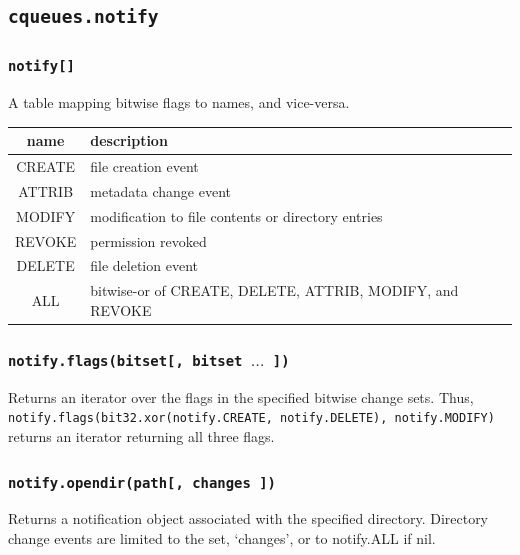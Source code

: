 \documentclass[11pt, oneside]{memoir}
\newcommand*{\fn}[1]{\texttt{#1}\xspace}
\newcounter{toccols}
\newenvironment{Module}[1]{
	\subsection{\texttt{#1}}
	\addtocontents{toc}{
		\protect\begin{multicols}{\value{toccols}}
	}
}{
	\addtocontents{toc}{\protect\end{multicols}}
}
\begin{document}
\begin{Module}{cqueues.notify}

\subsubsection[\fn{notify[]}]{\fn{notify[]}}
A table mapping bitwise flags to names, and vice-versa.

\begin{tabular}{c | l}

name & description \\\hline
CREATE & file creation event \\
ATTRIB & metadata change event \\
MODIFY & modification to file contents or directory entries \\ 
REVOKE & permission revoked \\
DELETE & file deletion event \\
ALL    & bitwise-or of CREATE, DELETE, ATTRIB, MODIFY, and REVOKE
\end{tabular}

\subsubsection[\fn{notify.flags}]{\fn{notify.flags(bitset[, bitset $\ldots$ ])}}

Returns an iterator over the flags in the specified bitwise change sets. Thus, \texttt{notify.flags(bit32.xor(notify.CREATE, notify.DELETE), notify.MODIFY)} returns an iterator returning all three flags.

\subsubsection[\fn{notify.opendir}]{\fn{notify.opendir(path[, changes ])}}

Returns a notification object associated with the specified directory. Directory change events are limited to the set, `changes', or to notify.ALL if nil.


\end{Module}
\end{document}
